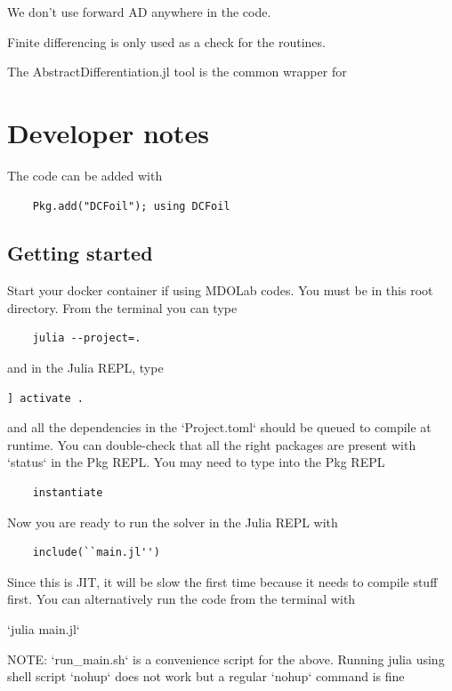 \documentclass[10pt]{article}
\begin{document}
We don't use forward AD anywhere in the code.

Finite differencing is only used as a check for the routines.

The AbstractDifferentiation.jl tool is the common wrapper for


\section{Developer notes}

The code can be added with

\begin{lstlisting}
	Pkg.add("DCFoil"); using DCFoil
\end{lstlisting}
\subsection{Getting started}

Start your docker container if using MDOLab codes.
You must be in this root directory. From the terminal you can type

\begin{lstlisting}
	julia --project=.
\end{lstlisting}

and in the Julia REPL, type

\begin{lstlisting}
] activate .
\end{lstlisting}

and all the dependencies in the `Project.toml` should be queued to compile at runtime.
You can double-check that all the right packages are present with `status` in the Pkg REPL.
You may need to type into the Pkg REPL

\begin{lstlisting}
	instantiate
\end{lstlisting}

Now you are ready to run the solver in the Julia REPL with
\begin{lstlisting}
	include(``main.jl'')
\end{lstlisting}

Since this is JIT, it will be slow the first time because it needs to compile stuff first.
You can alternatively run the code from the terminal with

`julia main.jl`

NOTE:
`run\_main.sh` is a convenience script for the above.
Running julia using shell script `nohup` does not work but a regular `nohup` command is fine
\end{document}
